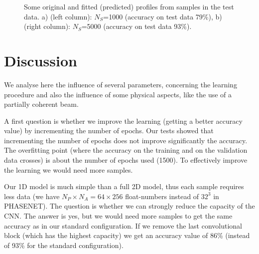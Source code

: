 \documentclass{iucr}
\newcommand{\todo}[1]{{\color{red}[TODO: "#1'']}}
\newcommand{\inred}[1]{{\color{red}#1}}
\begin{document}
\begin{figure}
    \caption{Some original and fitted (predicted) profiles from samples in the test data. a) (left column): $N_S$=1000 (accuracy on test data 79\%), b) (right column): $N_S$=5000 (accuracy on test  data 93\%). 
    }
\end{figure}

\section{Discussion}\label{sec:discussion}

We analyse here the influence of several parameters, concerning the learning procedure and also the influence of some physical aspects, like the use of a partially coherent beam.

A first question is whether we improve the learning (getting a better accuracy value) by incrementing the number of epochs. Our tests showed that incrementing the number of epochs does not improve significantly the accuracy. The overfitting point (where the accuracy on the training and on the validation data crosses) is about the number of epochs used (1500). To effectively improve the learning we would need more samples. 

Our 1D model is much simple than a full 2D model, thus each sample requires less data (we have $N_P\times N_A=64\times 256$ float-numbers instead of $32^3$ in PHASENET). The question is whether we can strongly reduce the capacity of the CNN. The answer is yes, but we would need more samples to get the same accuracy as in our standard configuration. If we remove the last convolutional block (which has the highest capacity) we get an accuracy value of 86\% (instead of 93\% for the standard configuration).
\end{document}
